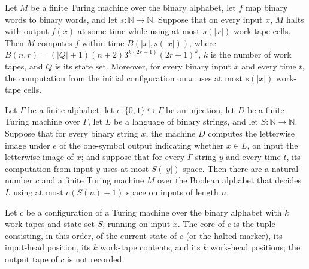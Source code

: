 \begin{theorem}
\label{Turing.FinTM.ComputesInSpace.computesFunInTime_and_forall_spaceUsed_le}
\leanok
{}
Let $M$ be a finite Turing machine over the binary alphabet, let $f$ map binary words to
binary words, and let $s:\mathbb{N}\to\mathbb{N}$. Suppose that on every input $x$, $M$
halts with output $f(x)$ at some time while using at most $s(|x|)$ work-tape cells. Then
$M$ computes $f$ within time $B(|x|,s(|x|))$, where
$B(n,r)=(|Q|+1)(n+2)3^{k(2r+1)}(2r+1)^k$, $k$ is the number of work tapes, and $Q$ is
its state set. Moreover, for every binary input $x$ and every time $t$, the computation
from the initial configuration on $x$ uses at most $s(|x|)$ work-tape cells.
\end{theorem}

\begin{theorem}
\label{Turing.FinTM.decidesInSpace_of_alphabetReduction}
\leanok
{}
Let $\Gamma$ be a finite alphabet, let $e:\{0,1\}\hookrightarrow\Gamma$ be an injection,
let $D$ be a finite Turing machine over $\Gamma$, let $L$ be a language of binary
strings, and let $S:\mathbb{N}\to\mathbb{N}$. Suppose that for every binary string $x$,
the machine $D$ computes the letterwise image under $e$ of the one-symbol output
indicating whether $x\in L$, on input the letterwise image of $x$; and suppose that for
every $\Gamma$-string $y$ and every time $t$, its computation from input $y$ uses at
most $S(|y|)$ space. Then there are a natural number $c$ and a finite Turing machine $M$
over the Boolean alphabet that decides $L$ using at most $c(S(n)+1)$ space on inputs of
length $n$.
\end{theorem}

\begin{theorem}
\label{Turing.MultiTapeTM.ConfigCount.core_eq}
\leanok
{}
Let $c$ be a configuration of a Turing machine over the binary alphabet with $k$ work
tapes and state set $S$, running on input $x$. The core of $c$ is the tuple consisting,
in this order, of the current state of $c$ (or the halted marker), its input-head
position, its $k$ work-tape contents, and its $k$ work-head positions; the output tape of
$c$ is not recorded.
\end{theorem}
